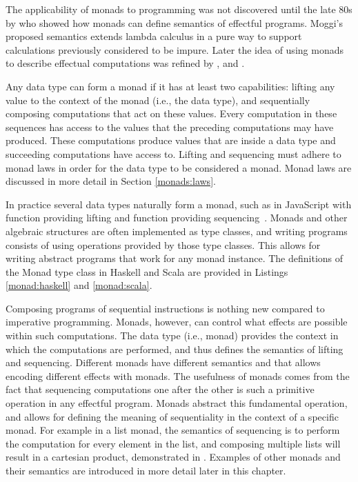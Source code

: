 



The applicability of monads to programming was not discovered until the late 80s by \textcite{comp-lambda-monads} who showed how monads can define semantics of effectful programs. Moggi's proposed semantics extends lambda calculus in a pure way to support calculations previously considered to be impure. Later the idea of using monads to describe effectual computations was refined by \textcite{comprehending-monads}, \textcite{notions-computations} and \textcite{monads-for-fp}. 

Any data type can form a monad if it has at least two capabilities: lifting any value to the context of the monad (i.e., the data type), and sequentially composing computations that act on these values. Every computation in these sequences has access to the values that the preceding computations may have produced. These computations produce values that are inside a data type and succeeding computations have access to. Lifting and sequencing must adhere to monad laws in order for the data type to be considered a monad. Monad laws are discussed in more detail in Section \ref{monads:laws}.

In practice several data types naturally form a monad, such as  in JavaScript with  function providing lifting and  function providing sequencing~\cite{js-array}. Monads and other algebraic structures are often implemented as type classes, and writing programs consists of using operations provided by those type classes. This allows for writing abstract programs that work for any monad instance. The definitions of the Monad type class in Haskell and Scala are provided in Listings \ref{monad:haskell} and \ref{monad:scala}.





Composing programs of sequential instructions is nothing new compared to imperative programming. Monads, however, can control what effects are possible within such computations. The data type (i.e., monad) provides the context in which the computations are performed, and thus defines the semantics of lifting and sequencing. Different monads have different semantics and that allows encoding different effects with monads. The usefulness of monads comes from the fact that sequencing computations one after the other is such a primitive operation in any effectful program. Monads abstract this fundamental operation, and allows for defining the meaning of sequentiality in the context of a specific monad. For example in a list monad, the semantics of sequencing is to perform the computation for every element in the list, and composing multiple lists will result in a cartesian product, demonstrated in . Examples of other monads and their semantics are introduced in more detail later in this chapter.

